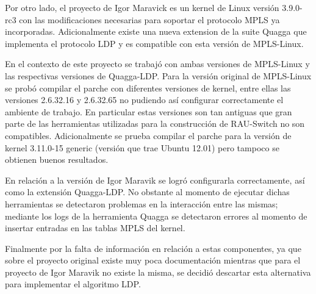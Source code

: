 Por otro lado, el proyecto de Igor Maravick es un kernel de Linux versi\'on 3.9.0-rc3 con las modificaciones necesarias para soportar el protocolo MPLS ya incorporadas. Adicionalmente existe una nueva extension de la suite Quagga que implementa el protocolo LDP \cite{QuaggaLDP2} y es compatible con esta versi\'on de MPLS-Linux.

En el contexto de este proyecto se trabaj\'o con ambas versiones de MPLS-Linux y las respectivas versiones de Quagga-LDP. Para la versi\'on original de MPLS-Linux se prob\'o compilar el parche con diferentes versiones de kernel, entre ellas las versiones 2.6.32.16 y 2.6.32.65 no pudiendo as\'i configurar correctamente el ambiente de trabajo. En particular estas versiones son tan antiguas que gran parte de las herramientas utilizadas para la construcci\'on de RAU-Switch no son compatibles. Adicionalmente se prueba compilar el parche para la versi\'on de kernel 3.11.0-15 generic (versi\'on que trae Ubuntu 12.01) pero tampoco se obtienen buenos resultados.

En relaci\'on a la versi\'on de Igor Maravik se logr\'o configurarla correctamente, as\'i como la extensi\'on Quagga-LDP. No obstante al momento de ejecutar dichas herramientas se detectaron problemas en la interacci\'on entre las mismas; mediante los logs de la herramienta Quagga se detectaron errores al momento de insertar entradas en las tablas MPLS del kernel.

Finalmente por la falta de información en relación a estas componentes, ya que sobre el proyecto original existe muy poca documentaci\'on mientras que para el proyecto de Igor Maravik no existe la misma, se decidi\'o descartar esta alternativa para implementar el algoritmo LDP. 